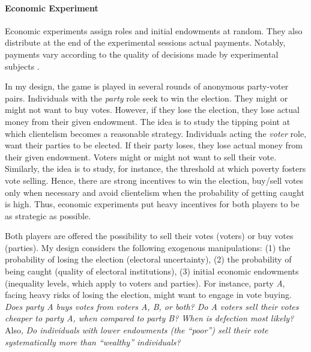 \documentclass[onesided]{article}\usepackage[]{graphicx}\usepackage[]{color}
\begin{document}


\paragraph{Economic Experiment} Economic experiments assign roles and initial endowments at random. They also distribute at the end of the experimental sessions actual payments. Notably, payments vary according to the quality of decisions made by experimental subjects \parencite{Morton:2010ly}. 

In my design, the game is played in several rounds of anonymous party-voter pairs. Individuals with the \emph{party} role seek to win the election. They might or might not want to buy votes. However, if they lose the election, they lose actual money from their given endowment. The idea is to study the tipping point at which clientelism becomes a reasonable strategy. Individuals acting the \emph{voter} role, want their parties to be elected. If their party loses, they lose actual money from their given endowment. Voters might or might not want to sell their vote. Similarly, the idea is to study, for instance, the threshold at which poverty fosters vote selling. Hence, there are strong incentives to win the election, buy/sell votes only when necessary and avoid clientelism when the probability of getting caught is high. Thus, economic experiments put heavy incentives for both players to be as strategic as possible. 

Both players are offered the possibility to sell their votes (voters) or buy votes (parties). My design considers the following exogenous manipulations: (1) the probability of losing the election (electoral uncertainty), (2) the probability of being caught (quality of electoral institutions), (3) initial economic endowments (inequality levels, which apply to voters and parties). For instance, party \emph{A}, facing heavy risks of losing the election, might want to engage in vote buying. \emph{Does party A buys votes from voters A, B, or both? Do A voters sell their votes cheaper to party A, when compared to party B? When is defection most likely?} Also, \emph{Do individuals with lower endowments (the ``poor'') sell their vote systematically more than ``wealthy'' individuals?} 
\end{document}
